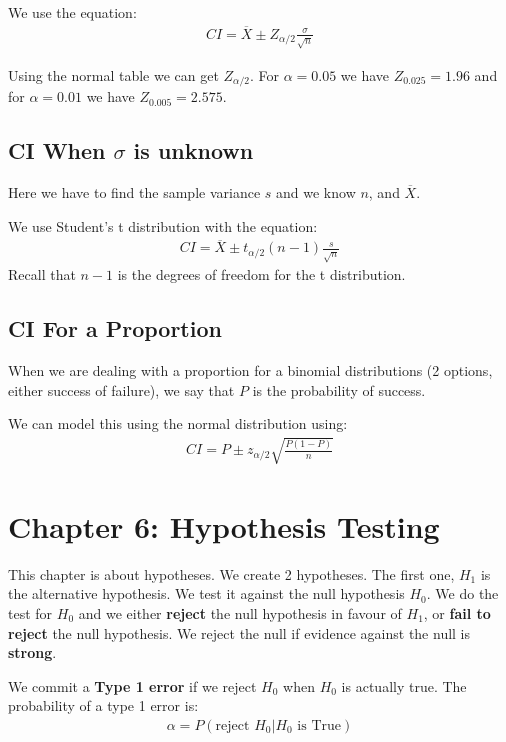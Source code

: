 \documentclass[12pt,letterpaper]{article} \usepackage{amsmath} \usepackage{graphicx} \usepackage[margin=1in]{geometry} \usepackage{longtable}  \usepackage{amssymb}
\begin{document}
	We use the equation:
	\begin{align*}
		CI = \overline X \pm Z_{\alpha/2} \frac{\sigma}{\sqrt n}
	\end{align*}

	Using the normal table we can get $Z_{\alpha/2}$. For $\alpha = 0.05$ we have $Z_{0.025} = 1.96$ and for $\alpha = 0.01$ we have $Z_{0.005} = 2.575$.
	
	\subsection{CI When $\sigma$ is unknown}
	Here we have to find the sample variance $s$ and we know $n$, and $\overline X$.
	
	We use Student's t distribution with the equation:
	\begin{align*}
		CI = \overline X \pm t_{\alpha/2}(n-1) \frac{s}{\sqrt n}
	\end{align*}
	Recall that $n-1$ is the degrees of freedom for the t distribution.
	
	\subsection{CI For a Proportion}
	When we are dealing with a proportion for a binomial distributions (2 options, either success of failure), we say that $P$ is the probability of success. 
	
	We can model this using the normal distribution using:
	\begin{align*}
		CI = P \pm z_{\alpha/2} \sqrt{\frac{P(1-P)}{n}}
	\end{align*}

	\section{Chapter 6: Hypothesis Testing}
	This chapter is about hypotheses. We create 2 hypotheses. The first one, $H_1$ is the alternative hypothesis. We test it against the null hypothesis $H_0$. We do the test for $H_0$ and we either \textbf{reject} the null hypothesis in favour of $H_1$, or \textbf{fail to reject} the null hypothesis. We reject the null if evidence against the null is \textbf{strong}.
	
	We commit a \textbf{Type 1 error} if we reject $H_0$ when $H_0$ is actually true. The probability of a type 1 error is:
	\begin{align*}
		\alpha = P(\text{reject }H_0 | H_0\text{ is True})
	\end{align*}
	
\end{document}
